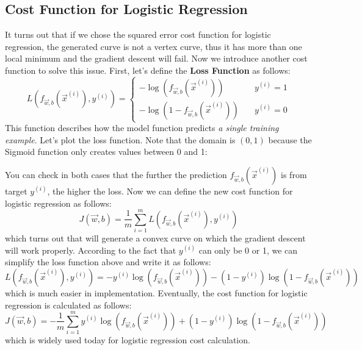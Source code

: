 \documentclass[a4paper, 12pt]{book}
\begin{document}
\subsection{Cost Function for Logistic Regression}
It turns out that if we chose the squared error cost function for logistic regression, the generated curve is not a vertex curve, thus it has more than one local minimum and the gradient descent will fail. Now we introduce another cost function to solve this issue. First, let's define the \textbf{Loss Function} as follows:
\[L(f_{\Vec{w},b}(\Vec{x}^{(i)}), y^{(i)}) = 
\begin{cases}
    -\log(f_{\Vec{w},b}(\Vec{x}^{(i)})) &\quad y^{(i)} = 1 \\
    -\log(1 - f_{\Vec{w},b}(\Vec{x}^{(i)})) &\quad y^{(i)} = 0
\end{cases}
\]
This function describes how the model function predicts \emph{a single training example}. Let's plot the loss function. Note that the domain is $(0,1)$ because the Sigmoid function only creates values between 0 and 1:
\begin{center}
\end{center}
You can check in both cases that the further the prediction $f_{\Vec{w},b}(\Vec{x}^{(i)})$ is from target $y^{(i)}$, the higher the loss. Now we can define the new cost function for logistic regression as follows: \[J(\Vec{w},b) = \frac{1}{m}\sum_{i=1}^{m} L(f_{\Vec{w},b}(\Vec{x}^{(i)}), y^{(i)})\] which turns out that will generate a convex curve on which the gradient descent will work properly. According to the fact that $y^{(i)}$ can only be 0 or 1, we can simplify the loss function above and write it as follows: \[L(f_{\Vec{w},b}(\Vec{x}^{(i)}), y^{(i)}) = -y^{(i)}\log(f_{\Vec{w},b}(\Vec{x}^{(i)})) - (1-y^{(i)})\log(1 - f_{\Vec{w},b}(\Vec{x}^{(i)}))\] which is much easier in implementation. Eventually, the cost function for logistic regression is calculated as follows: \[J(\Vec{w},b) = -\frac{1}{m}\sum_{i=1}^{m} y^{(i)}\log(f_{\Vec{w},b}(\Vec{x}^{(i)})) + (1-y^{(i)})\log(1 - f_{\Vec{w},b}(\Vec{x}^{(i)}))\] which is widely used today for logistic regression cost calculation.
\newpage
\end{document}
